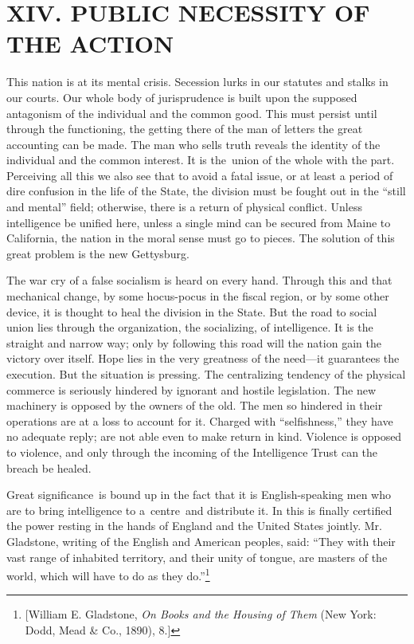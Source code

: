 \documentclass[openany,nobib]{tufte-book}
\begin{document}
\hypertarget{xiv-public-necessity-of-the-action}{%
\section{XIV. PUBLIC NECESSITY OF THE
ACTION}\label{xiv-public-necessity-of-the-action}}

This nation is at its mental crisis. Secession lurks in our statutes and
stalks in our courts. Our whole body of jurisprudence is built upon the
supposed antagonism of the individual and the common good. This must
persist until through the functioning, the getting there of the man of
letters the great accounting can be made. The man who sells truth
reveals the identity of the individual and the common interest. It is
the~union of the whole with the part. Perceiving all this we also see
that to avoid a fatal issue, or at least a period of dire confusion in
the life of the State, the division must be fought out in the ``still
and mental'' field; otherwise, there is a return of physical conflict.
Unless intelligence be unified here, unless a single mind can be secured
from Maine to California, the nation in the moral sense must go to
pieces. The solution of this great problem is the new Gettysburg.~

The war cry of a false socialism is heard on every hand. Through this
and that mechanical change, by some hocus-pocus in the fiscal region, or
by some other device, it is thought to heal the division in the State.
But the road to social union lies through the organization, the
socializing, of intelligence. It is the straight and narrow way; only by
following this road will the nation gain the victory over itself. Hope
lies in the very greatness of the need---it guarantees the execution.
But the situation is pressing. The centralizing tendency of the physical
commerce is seriously hindered by ignorant and hostile legislation. The
new machinery is opposed by the owners of the old. The men so hindered
in their operations are at a loss to account for it. Charged with
``selfishness,'' they have no adequate reply; are not able even to make
return in kind. Violence is opposed to violence, and only through the
incoming of the Intelligence Trust can the breach be healed.~

Great significance~is bound up in the fact that it is English-speaking
men who are to bring intelligence to a~centre~and distribute it. In this
is finally certified the power resting in the hands of England and the
United States jointly. Mr. Gladstone, writing of the English and
American peoples, said: ``They with their vast range of inhabited
territory, and their unity of tongue, are masters of the world, which
will have to do as they do.''\footnote{{[}William E. Gladstone, \emph{On
  Books and the Housing of Them} (New York: Dodd, Mead \& Co., 1890),
  8.{]}}~
\end{document}
